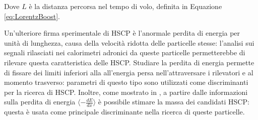 Dove $L$ è la distanza percorsa nel tempo di volo, definita in Equazione \ref{eq:LorentzBoost}.

Un'ulteriore firma sperimentale di HSCP è l'anormale perdita di energia per unità di lunghezza, causa della velocità ridotta delle particelle stesse: l'analisi sui segnali rilasciati nei calorimetri adronici da queste particelle permetterebbe di rilevare questa caratteristica delle HSCP. Studiare la perdita di energia permette di fissare dei limiti inferiori alla all'energia persa nell'attraversare i rilevatori e al momento trasverso: parametri di questo tipo sono utilizzati come discriminanti per la ricerca di HSCP. Inoltre, come mostrato in \cite{CMS-PAS-EXO-16-036}, a partire dalle informazioni sulla perdita di energia $\langle -\frac{dE}{dx}\rangle$ è possibile stimare la massa dei candidati HSCP: questa è usata come principale discriminante nella ricerca di queste particelle.


